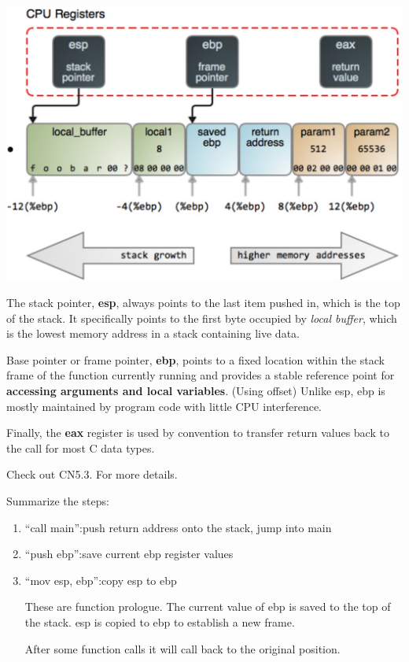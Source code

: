 \documentclass[letterpaper,12pt]{article}
\begin{document}
\includegraphics*[scale = 0.3]{./summary_image/Stack_frame.png}

The stack pointer, \textbf{esp}, always points to the last item pushed in, which is the top of the stack. It specifically points to the first byte occupied by \textit{local buffer}, which is the lowest memory address in a stack containing live data.

Base pointer or frame pointer, \textbf{ebp}, points to a fixed location within the stack frame of the function currently running and provides a stable reference point for \textbf{accessing arguments and local variables}. (Using offset) Unlike esp, ebp is mostly maintained by program code with little CPU interference.

Finally, the \textbf{eax} register is used by convention to transfer return values back to the call for most C data types.

Check out CN5.3. For more details.

Summarize the steps:
\begin{enumerate}
      \item ``call main'':push return address onto the stack, jump into main
      \item ``push ebp'':save current ebp register values
      \item ``mov esp, ebp'':copy esp to ebp

            These are function prologue. The current value of ebp is saved to the top of
            the stack. esp is copied to ebp to establish a new frame.

            After some function calls it will call back to the original position.
\end{enumerate}
\end{document}
